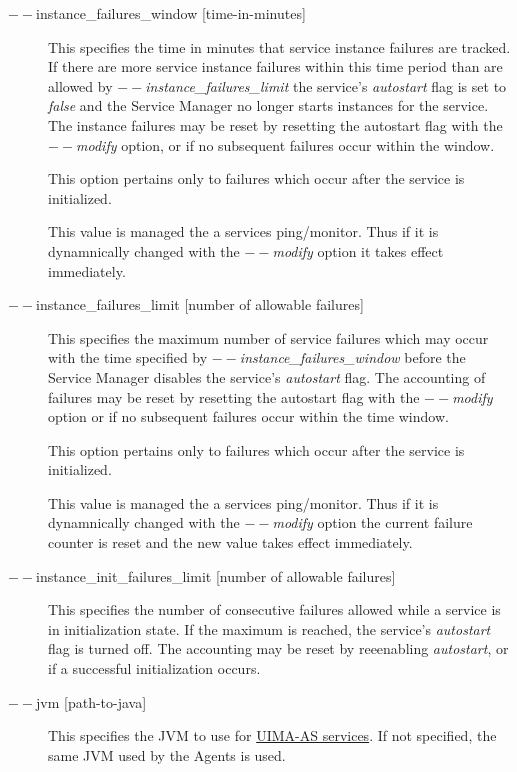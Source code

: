 \begin{description}
        \item[$--$instance\_failures\_window {[time-in-minutes]}]
          This specifies the time in minutes that service instance failures are tracked.   If
          there are more service instance failures within this time period than are allowed
          by {\em$--$instance\_failures\_limit} the service's {\em autostart} flag is set to
          {\em false} and the Service Manager no longer starts instances for the service.
          The instance failures may be reset by resetting the autostart flag with
          the {\em $--$modify} option, or if no subsequent failures occur within the window.

          This option pertains only to failures which occur after the service is initialized.

          This value is managed the a services ping/monitor.  Thus if it is dynamnically changed
          with the {\em $--$modify} option it takes effect immediately.

        \item[$--$instance\_failures\_limit {[number of allowable failures]}]
          This specifies the maximum number of service failures which may occur with the
          time specified by {\em $--$instance\_failures\_window} before the Service Manager
          disables the service's {\em autostart} flag.  The accounting of failures may be
          reset by resetting the autostart flag with the {\em$--$modify} option or if
          no subsequent failures occur within the time window.

          This option pertains only to failures which occur after the service is initialized.

          This value is managed the a services ping/monitor.  Thus if it is dynamnically changed
          with the {\em $--$modify} option the current failure counter is reset and the 
          new value takes effect immediately.

        \item[$--$instance\_init\_failures\_limit {[number of allowable failures]}]
          This specifies the number of consecutive failures allowed while a service is in
          initialization state.   If the maximum is reached, the service's {\em autostart}
          flag is turned off.  The accounting may be reset by reeenabling {\em autostart}, or
          if a successful initialization occurs.

        \item[$--$jvm {[path-to-java]}] This specifies the JVM to use for 
          \hyperref[sec:services.types]{UIMA-AS services}. If not
          specified, the same JVM used by the Agents is used.  


\end{description}
